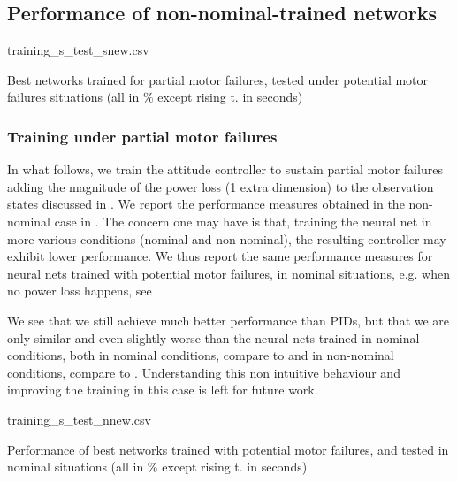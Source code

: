 \documentclass[anonymous=true,format=sigconf, screen=true, review=false]{acmart}
\begin{document}
\subsection{Performance of non-nominal-trained networks}

\begin{csvtable*}{training_s_test_snew.csv}
\caption{Best networks trained for partial motor failures, tested under potential motor failures situations (all in \% except rising t. in seconds)}
\label{table:failnonnomnonnom}
\end{csvtable*}

\subsubsection{Training under partial motor failures}
In what follows, we train the attitude controller to sustain 
partial motor failures
adding the magnitude of the power loss (1 extra dimension) to the observation states discussed in . We report the performance measures obtained in the non-nominal case in . 
The concern one may have is that, training the neural net in more various conditions (nominal and non-nominal), the resulting controller may exhibit lower performance. We thus report the same performance measures for neural nets trained with potential motor failures, in nominal situations, e.g. when no power loss happens, see  

We see that we still achieve much better performance than PIDs, but that we are only similar and even slightly worse than the neural nets trained in nominal conditions, both in nominal conditions, compare  to    and in non-nominal conditions, compare   to . Understanding this non intuitive behaviour and improving the training in this case is left for future work. 

\begin{csvtable*}{training_s_test_nnew.csv}
\caption{Performance of best networks trained with potential motor failures, and tested in nominal situations (all in \% except rising t. in seconds)}
\label{table:failnonnomnom}
\end{csvtable*}
\end{document}
